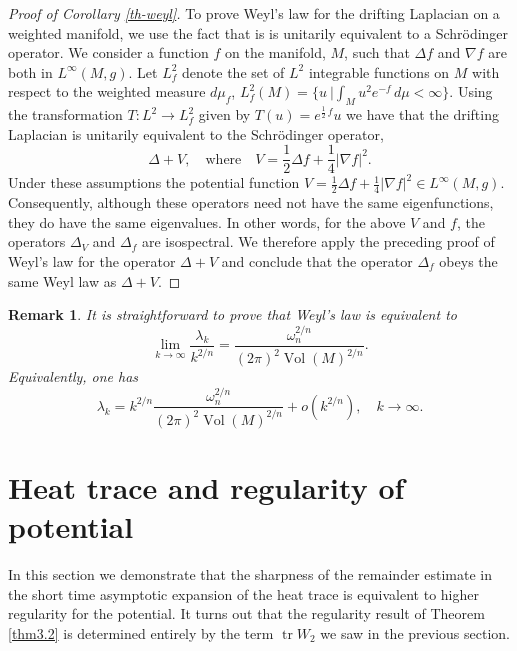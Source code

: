 \documentclass[letterpaper,12pt]{amsart}
\newtheorem{remark}[thm]{Remark}
\newcommand{\tr}{\mathop{\mathrm{tr}}}
\newcommand{\Vol}{\operatorname{Vol}}
\begin{document}
\begin{proof}[Proof of Corollary \ref{th-weyl}]
To prove Weyl's law for the drifting Laplacian on a weighted manifold, we use the fact that is is unitarily equivalent to a Schr\"odinger operator. We consider a function $f$ on the manifold, $M$, such that $\Delta f$ and $\nabla f$ are both in $L^\infty (M,g)$.  Let $L^2_f$ denote the set of $L^2$ integrable functions on $M$ with respect to the weighted measure $d\mu_f$,  $L_f^2(M) =\{ u\ \big| \int_M u^2 e^{-f} \, d\mu <\infty \} $. Using the transformation $T: L^2 \to L^2_f$ given by $T(u)=e^{\frac 12 \, f}u$ we have that the drifting Laplacian is unitarily equivalent to the Schr\"odinger operator,
$$\Delta + V, \quad \text{where}  \quad V = \frac{1}{2} \Delta f + \frac{1}{4} | \nabla f|^2.$$
Under these assumptions the potential function $V = \frac{1}{2} \Delta f + \frac{1}{4} | \nabla f|^2 \in L^\infty (M,g)$. Consequently, although these operators need not have the same eigenfunctions, they do have the same eigenvalues.  In other words, for the above $V$ and $f$, the operators $\Delta_V$ and $\Delta_f$ are isospectral.   We therefore apply the preceding proof of Weyl's law for the operator $\Delta + V$ and conclude that the operator $\Delta_f$ obeys the same Weyl law as $\Delta + V$.
\end{proof}


\begin{remark}
It is straightforward to prove that Weyl's law is equivalent to
$$\lim_{k \to \infty} \frac{\lambda_k}{k^{2/n}} = \frac{ \omega_n^{2/n}}{(2\pi)^{2} \Vol (M)^{2/n}}.$$
Equivalently, one has
$$\lambda_k = k^{2/n} \frac{ \omega_n^{2/n}}{(2\pi)^{2} \Vol  (M)^{2/n}} + o(k^{2/n}), \quad k \to \infty.$$
\end{remark}




\section{Heat trace and regularity of potential} \label{S3}
In this section we demonstrate that the sharpness of the remainder estimate in the short time asymptotic expansion of the heat trace is equivalent to higher regularity for the potential. It turns out that the regularity result of Theorem \ref{thm3.2} is determined entirely by the term $\tr W_2$ we saw in the previous section.
\end{document}
